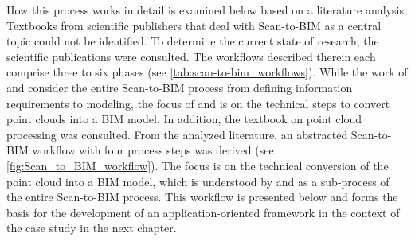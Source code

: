 \begin{English}
    How this process works in detail is examined below based on a literature analysis. Textbooks from scientific publishers that deal with Scan-to-BIM as a central topic could not be identified. To determine the current state of research, the scientific publications \cite{wangApplicationOrientedScantoBIM2019, badenkoSCANTOBIMMETHODOLOGYADAPTED2019, borrusoProceduralPointCloud2023, rashdiScanningTechnologiesBuilding2022} were consulted. The workflows described therein each comprise three to six phases (see \ref{tab:scan-to-bim_workflows}). While the work of \cite{wangApplicationOrientedScantoBIM2019} and \cite{badenkoSCANTOBIMMETHODOLOGYADAPTED2019} consider the entire Scan-to-BIM process from defining information requirements to modeling, the focus of \cite{borrusoProceduralPointCloud2023} and \cite{rashdiScanningTechnologiesBuilding2022} is on the technical steps to convert point clouds into a BIM model. In addition, the textbook \cite{liu3DPointCloud2021} on point cloud processing was consulted. From the analyzed literature, an abstracted Scan-to-BIM workflow with four process steps was derived (see \ref{fig:Scan_to_BIM_workflow}). The focus is on the technical conversion of the point cloud into a BIM model, which is understood by \cite{wangApplicationOrientedScantoBIM2019} and \cite{badenkoSCANTOBIMMETHODOLOGYADAPTED2019} as a sub-process of the entire Scan-to-BIM process. This workflow is presented below and forms the basis for the development of an application-oriented framework in the context of the case study in the next chapter.
\end{English}

